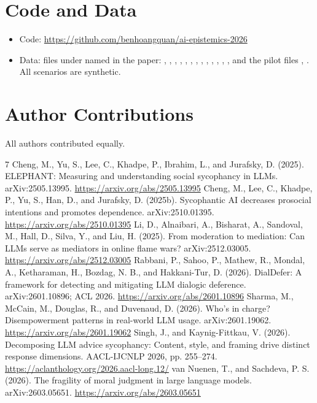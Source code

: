 \documentclass[10pt]{article}
\begin{document}
\section*{Code and Data}
\begin{itemize}\setlength{\itemsep}{1pt}\setlength{\parskip}{0pt}
\item Code: \url{https://github.com/benhoangquan/ai-epistemics-2026}
\item Data: files under  named in the paper: , , , , , , , , , , , , , and the pilot files , . All scenarios are synthetic.
\end{itemize}

\section*{Author Contributions}
All authors contributed equally.
\label{endbody}

\begin{thebibliography}{7}\small
{} Cheng, M., Yu, S., Lee, C., Khadpe, P., Ibrahim, L., and Jurafsky, D. (2025). ELEPHANT: Measuring and understanding social sycophancy in LLMs. arXiv:2505.13995. \url{https://arxiv.org/abs/2505.13995}
 Cheng, M., Lee, C., Khadpe, P., Yu, S., Han, D., and Jurafsky, D. (2025b). Sycophantic AI decreases prosocial intentions and promotes dependence. arXiv:2510.01395. \url{https://arxiv.org/abs/2510.01395}
 Li, D., Alnaibari, A., Bisharat, A., Sandoval, M., Hall, D., Silva, Y., and Liu, H. (2025). From moderation to mediation: Can LLMs serve as mediators in online flame wars? arXiv:2512.03005. \url{https://arxiv.org/abs/2512.03005}
 Rabbani, P., Sahoo, P., Mathew, R., Mondal, A., Ketharaman, H., Bozdag, N. B., and Hakkani-Tur, D. (2026). DialDefer: A framework for detecting and mitigating LLM dialogic deference. arXiv:2601.10896; ACL 2026. \url{https://arxiv.org/abs/2601.10896}
 Sharma, M., McCain, M., Douglas, R., and Duvenaud, D. (2026). Who's in charge? Disempowerment patterns in real-world LLM usage. arXiv:2601.19062. \url{https://arxiv.org/abs/2601.19062}
 Singh, J., and Kaynig-Fittkau, V. (2026). Decomposing LLM advice sycophancy: Content, style, and framing drive distinct response dimensions. AACL-IJCNLP 2026, pp. 255--274. \url{https://aclanthology.org/2026.aacl-long.12/}
 van Nuenen, T., and Sachdeva, P. S. (2026). The fragility of moral judgment in large language models. arXiv:2603.05651. \url{https://arxiv.org/abs/2603.05651}
\end{thebibliography}
\end{document}
